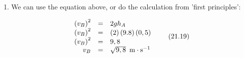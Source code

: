 {\begin{mdframed}[linewidth=4, leftmargin=40, rightmargin=40]
\begin{exercise}
\begin{enumerate}[noitemsep, label=\textbf{Step} \textbf{\arabic*}. ]
    \begin{equation}
    g{h}_{A}=\frac{1}{2}{\left({v}_{B}\right)}^{2}\tag{21.17}
      \end{equation}
        \label{m38786*id70340}\nopagebreak\noindent{}
          
    \begin{equation}
    2g{h}_{A}={\left({v}_{B}\right)}^{2}\tag{21.18}
      \end{equation}
        \label{m38786*id70382}This proves that the velocity of the ball is independent of its mass. It does not matter what its mass is, it will always have the same velocity when it falls through this height.\par 
        \item  
        \label{m38786*id70393}We can use the equation above, or do the calculation from 'first principles':\par 
        \label{m38786*id70397}\nopagebreak\noindent{}
          
    \begin{equation}
    \begin{array}{ccc}\hfill {\left({v}_{B}\right)}^{2}& =& 2g{h}_{A}\hfill \\ \hfill {\left({v}_{B}\right)}^{2}& =& \left(2\right)\left(9.8\right)\left(0,5\right)\hfill \\ \hfill {\left({v}_{B}\right)}^{2}& =& 9,8\hfill \\ \hfill {v}_{B}& =& \sqrt{9,8}\phantom{\rule{3.33333pt}{0ex}}\phantom{\rule{0.166667em}{0ex}}\mathrm{m}\ensuremath{\cdot}{\mathrm{s}}^{-1}\hfill \end{array}\tag{21.19}
      \end{equation}
        \end{enumerate}
    \end{exercise}
    \end{mdframed}
    }
    \noindent
\label{m38786*secfhsst!!!underscore!!!id2545}
